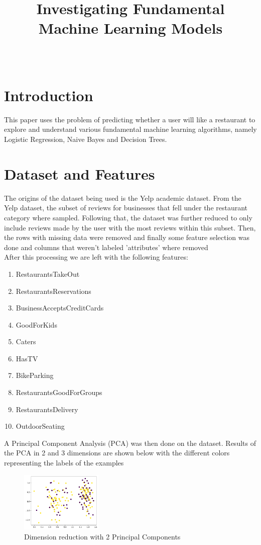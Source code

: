 \documentclass{sigchi}
\def\plaintitle{Investigating Fundamental Machine Learning Models}
\begin{document}
\title{\plaintitle}

\author{%
  \\
}

\maketitle
\section{Introduction}
This paper uses the problem of predicting whether a user will like a restaurant to explore and understand various fundamental machine learning algorithms, namely Logistic Regression, Naive Bayes and Decision Trees.
\section{Dataset and Features}
The origins of the dataset being used is the Yelp academic dataset.
From the Yelp dataset, the subset of reviews for businesses that fell under the restaurant category where sampled.
Following that, the dataset was further reduced to only include reviews made by the user with the most reviews within this subset.
Then, the rows with missing data were removed and finally some feature selection was done and columns that weren't labeled 'attributes' where removed\\
After this processing we are left with the following features:
\begin{enumerate}
  \item RestaurantsTakeOut
  \item RestaurantsReservations
  \item BusinessAcceptsCreditCards
  \item GoodForKids
  \item Caters
  \item HasTV
  \item BikeParking
  \item RestaurantsGoodForGroups
  \item RestaurantsDelivery
  \item OutdoorSeating
\end{enumerate}
A Principal Component Analysis (PCA) was then done on the dataset.
Results of the PCA in 2 and 3 dimensions are shown below with the different colors representing the labels of the examples
\begin{figure}[H]
  \centering
  \includegraphics[width=0.35\textwidth]{figures/2dplot.png}
  \caption{Dimension reduction with 2 Principal Components}
  \label{fig:2PC}
\end{figure}
\end{document}
